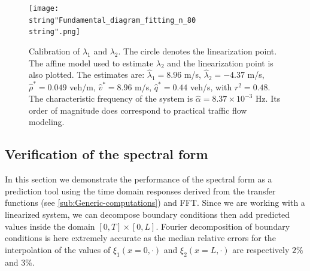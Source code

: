 \documentclass[5p,twocolumn]{elsarticle}
\begin{document}
\begin{figure}
\centering
\texttt{[image: \\string"Fundamental\_diagram\_fitting\_n\_80\\string".png]}
\protect\caption{Calibration of $\lambda_{1}$ and $\lambda_{2}$. The circle denotes the linearization point. The affine model used to estimate $\lambda_{2}$ and the linearization point is also plotted. The estimates are: $\widehat{\lambda}_{1}=8.96$ m/s, $\widehat{\lambda}_{2}=-4.37$ m/s, $\widehat{\rho}^{*}=0.049$ veh/m, $\widehat{v}^{*}=8.96$ m/s, $\widehat{q}^{*}=0.44$ veh/s, with $r^{2}=0.48$. The characteristic frequency of the system is $\widehat{\alpha} = 8.37\times10^{-3}$ Hz. Its order of magnitude does correspond to practical traffic flow modeling.}
\label{fig:Calibration-of-eigen-values}
\end{figure}

\subsection{Verification of the spectral form}
In this section we demonstrate the performance of the spectral form as a prediction tool using the time domain responses derived from the transfer functions (see \ref{sub:Generic-computations}) and FFT. Since we are working with a linearized system, we can decompose boundary conditions then add predicted values inside the domain $\left[0,T\right]\times\left[0,L\right]$. Fourier decomposition of boundary conditions is here extremely accurate as the median relative errors for the interpolation of the values of $\xi_{1}\left(x=0, \cdot \right)$ and $\xi_{2}\left(x=L, \cdot \right)$ are respectively $2\%$ and $3\%$.
\end{document}

